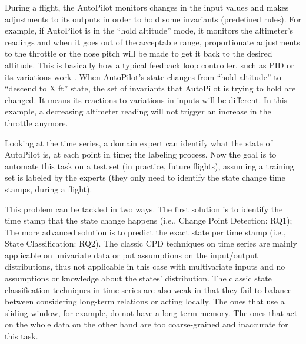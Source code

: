 

During a flight, the AutoPilot monitors changes in the input values and makes adjustments to its outputs in order to hold some invariants (predefined rules). 
For example, if AutoPilot is in the ``hold altitude'' mode, it monitors the altimeter's readings and when it goes out of the acceptable range, proportionate adjustments to the throttle or the nose pitch will be made to get it back to the desired altitude. This is basically how a typical feedback loop controller, such as PID or its variations work \cite{feedbacksystemsBook}.
When AutoPilot's state changes from ``hold altitude'' to ``descend to X ft'' state, the set of invariants that AutoPilot is trying to hold are changed. It means its reactions to variations in inputs will be different. In this example, a decreasing altimeter reading will not trigger an increase in the throttle anymore.

Looking at the time series, a domain expert can identify what the state of AutoPilot is, at each point in time; the labeling process. Now the goal is to automate this task on a test set (in practice, future flights), assuming a training set is labeled by the experts (they only need to identify the state change time stamps, during a flight). 

This problem can be tackled in two ways. The first solution is to identify the time stamp that the state change happens (i.e., Change Point Detection: RQ1); The more advanced solution is to predict the exact state per time stamp (i.e., State Classification: RQ2). The classic CPD techniques on time series \cite{Truong2018ChangePointSurvey} are mainly applicable on univariate data or put assumptions on the input/output distributions, thus not applicable in this case with multivariate inputs and no assumptions or knowledge about the states' distribution. The classic state classification techniques in time series are also weak in that %
they fail to balance between considering long-term relations or acting locally. The ones that use a sliding window, for example, do not have a long-term memory. The ones that act on the whole data on the other hand are too coarse-grained and inaccurate for this task.

